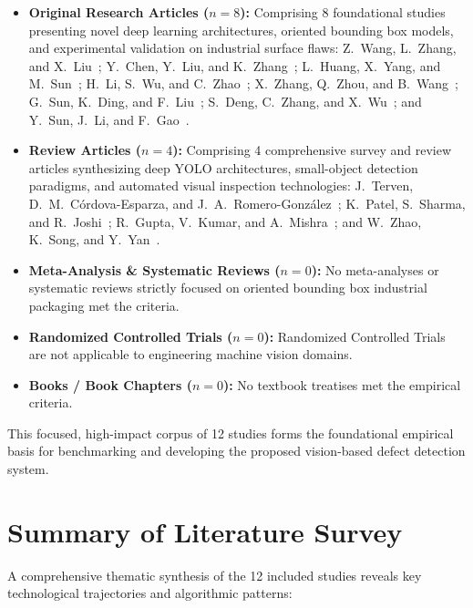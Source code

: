 \begin{itemize}
\item \textbf{Original Research Articles ($n = 8$):} Comprising 8 foundational studies presenting novel deep learning architectures, oriented bounding box models, and experimental validation on industrial surface flaws: Z.~Wang, L.~Zhang, and X.~Liu~\cite{wang2024rgs}; Y.~Chen, Y.~Liu, and K.~Zhang~\cite{chen2025obb}; L.~Huang, X.~Yang, and M.~Sun~\cite{huang2026msfe}; H.~Li, S.~Wu, and C.~Zhao~\cite{li2024pv}; X.~Zhang, Q.~Zhou, and B.~Wang~\cite{zhang2025msf}; G.~Sun, K.~Ding, and F.~Liu~\cite{sun2023ds}; S.~Deng, C.~Zhang, and X.~Wu~\cite{deng2024probiou}; and Y.~Sun, J.~Li, and F.~Gao~\cite{sun2026edgedeployable}.
\item \textbf{Review Articles ($n = 4$):} Comprising 4 comprehensive survey and review articles synthesizing deep YOLO architectures, small-object detection paradigms, and automated visual inspection technologies: J.~Terven, D.~M.~C{\'o}rdova-Esparza, and J.~A.~Romero-Gonz{\'a}lez~\cite{terven2023yolo}; K.~Patel, S.~Sharma, and R.~Joshi~\cite{patel2023deep}; R.~Gupta, V.~Kumar, and A.~Mishra~\cite{gupta2024benchmark}; and W.~Zhao, K.~Song, and Y.~Yan~\cite{zhao2024small}.
\item \textbf{Meta-Analysis \& Systematic Reviews ($n = 0$):} No meta-analyses or systematic reviews strictly focused on oriented bounding box industrial packaging met the criteria.
\item \textbf{Randomized Controlled Trials ($n = 0$):} Randomized Controlled Trials are not applicable to engineering machine vision domains.
\item \textbf{Books / Book Chapters ($n = 0$):} No textbook treatises met the empirical criteria.
\end{itemize}

This focused, high-impact corpus of 12 studies forms the foundational empirical basis for benchmarking and developing the proposed vision-based defect detection system.

\section{Summary of Literature Survey}
\label{sec:litsummary}

A comprehensive thematic synthesis of the 12 included studies reveals key technological trajectories and algorithmic patterns:

